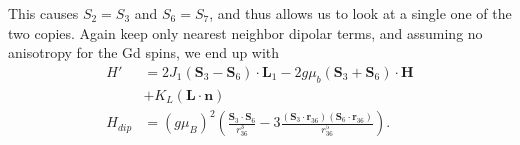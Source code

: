 This causes $S_2 = S_3$ and $S_6 = S_7$, and thus allows us to look at a single one of the two copies. Again keep only nearest neighbor dipolar terms, and assuming no anisotropy for the Gd spins, we end up with
\begin{align}
	H' &= 2J_1(\mathbf{S}_3 - \mathbf{S}_6)\cdot\mathbf{L}_1 - 2g \mu_b (\mathbf{S}_3 + \mathbf{S}_6) \cdot \mathbf{H} \\
	&+ K_L (\mathbf{L} \cdot \mathbf{n}) \\
	H_{dip} &= (g \mu_B)^2\left(\frac{\mathbf{S}_3\cdot \mathbf{S}_6}{r_{36}^3}-3\frac{(\mathbf{S}_3\cdot \mathbf{r}_{36})(\mathbf{S}_6\cdot \mathbf{r}_{36})}{r_{36}^5}\right).
\end{align}

\printbibliography
